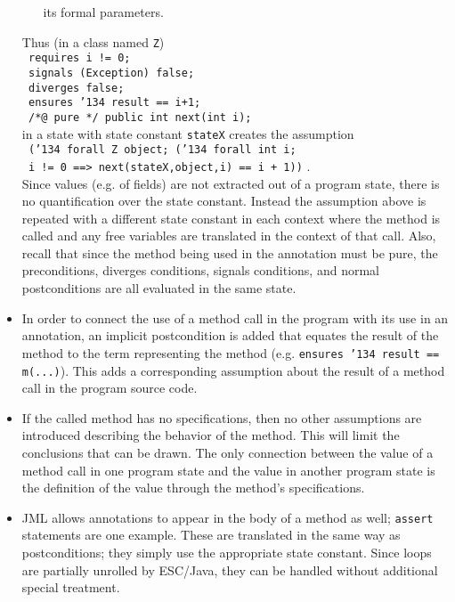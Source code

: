 \documentclass{sig-alternate2}
\begin{document}
\begin{itemize}
\begin{itemize}
its formal parameters.  
\end{itemize}
Thus (in a class named \texttt{Z})\\
{\indent \texttt{        requires i != 0;}\\
\indent \texttt{        signals (Exception) false;}\\
\indent \texttt{        diverges false;}\\
\indent \texttt{       ensures \char'134 result == i+1; }\\
\indent \texttt{        /*@ pure */ public int next(int i);}\\
}
in a state with state constant \texttt{stateX} creates the assumption \\
{\indent \texttt{ (\char'134 forall Z object; (\char'134 forall int i;  }\\ 
\indent \texttt{ i != 0 ==> next(stateX,object,i) == i + 1))} .} \\
Since values (e.g. of fields) are not extracted out of a program state, there is no quantification over
the state constant.  Instead the assumption above is repeated with a different state constant
in each context where the method
is called and any free variables are translated in the context of that call.  Also, recall that since
the method being used in the annotation must be pure, the preconditions, diverges conditions,
signals conditions, and normal postconditions are all evaluated in the same state.
\item In order to connect the use of a method call in the program with its use in an annotation,
an implicit postcondition is added that equates the result of the method to the term representing
the method (e.g. {\tt ensures \char'134 result == m(...)}).  This adds a corresponding assumption 
about the result of a method call in the program source code.
\item If the called method has no specifications, then no other assumptions are introduced
describing the behavior of the method.  This will limit the conclusions that can be drawn.
The only connection between the value of a method call in one program state and the value in
another program state is the definition of the value through the method's specifications.
\item JML allows annotations to appear in the body of a method as well; \texttt{assert}
statements are one example.  These are translated in the same way as postconditions; they simply
use the appropriate state constant.  Since loops are partially unrolled by ESC/Java, they can be
handled without additional special treatment.
\end{itemize}
\end{document}
